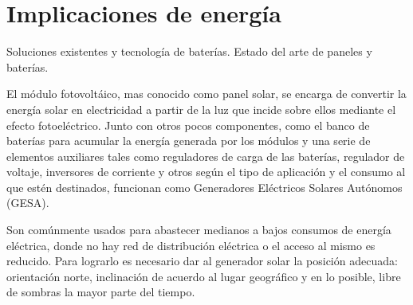 \section{Implicaciones de energía}
\label{sec:energía}

Soluciones existentes y tecnología de baterías. Estado del arte de paneles y baterías.

El módulo fotovoltáico, mas conocido como panel solar, se encarga de convertir la energía solar en electricidad a partir de la luz que incide sobre ellos mediante el efecto fotoeléctrico. Junto con otros pocos componentes, como el banco de baterías para acumular la energía generada por los módulos y una serie de elementos auxiliares tales como reguladores de carga de las baterías, regulador de voltaje, inversores de corriente y otros según el tipo de aplicación y el consumo al que estén destinados, funcionan como Generadores Eléctricos Solares Autónomos (GESA).

Son comúnmente usados para abastecer medianos a bajos consumos de energía eléctrica, donde no hay red de distribución eléctrica o el acceso al mismo es reducido. Para lograrlo es necesario dar al generador solar la posición adecuada: orientación norte, inclinación de acuerdo al lugar geográfico y en lo posible, libre de sombras la mayor parte del tiempo.


